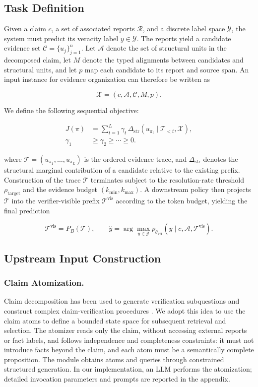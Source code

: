 \documentclass[letterpaper]{article}
\begin{document}
\subsection{Task Definition}

Given a claim $c$, a set of associated reports $\mathcal R$, and a discrete label space $\mathcal Y$, the system must predict its veracity label $y\in\mathcal Y$. The reports yield a candidate evidence set $\mathcal C=\{u_j\}_{j=1}^{n}$. Let $\mathcal A$ denote the set of structural units in the decomposed claim, let $M$ denote the typed alignments between candidates and structural units, and let $p$ map each candidate to its report and source span. An input instance for evidence organization can therefore be written as

\[
\mathcal X=(c,\mathcal A,\mathcal C,M,p).
\]

We define the following sequential objective:

\[
\begin{aligned}
J(\pi)
&=\sum_{t=1}^{L}\gamma_t\,
\Delta_{\mathrm{str}}\!\left(u_{\pi_t}\mid \mathcal T_{<t},\mathcal X\right),\\
\gamma_1&\ge\gamma_2\ge\cdots\ge 0.
\end{aligned}
\]

where $\mathcal T=(u_{\pi_1},\ldots,u_{\pi_L})$ is the ordered evidence trace, and $\Delta_{\mathrm{str}}$ denotes the structural marginal contribution of a candidate relative to the existing prefix. Construction of the trace $\mathcal T$ terminates subject to the resolution-rate threshold $\rho_{\mathrm{target}}$ and the evidence budget $(k_{\min}, k_{\max})$. A downstream policy then projects $\mathcal T$ into the verifier-visible prefix $\mathcal T^{\mathrm{vis}}$ according to the token budget, yielding the final prediction

\[
\mathcal T^{\mathrm{vis}}=P_B(\mathcal T),
\qquad
\hat y=\arg\max_{y\in\mathcal Y}
p_{\theta_{\mathrm{ver}}}(y\mid c,\mathcal A,\mathcal T^{\mathrm{vis}}).
\]

\subsection{Upstream Input Construction}

\subsubsection{Claim Atomization.}

Claim decomposition has been used to generate verification subquestions and construct complex claim-verification procedures \citep{Chen2022ClaimDecomp,Pan2023ProgramFC,Chen2023WildEvidence}. We adopt this idea to use the claim atoms to define a bounded state space for subsequent retrieval and selection. The atomizer reads only the claim, without accessing external reports or fact labels, and follows independence and completeness constraints: it must not introduce facts beyond the claim, and each atom must be a semantically complete proposition. The module obtains atoms and queries through constrained structured generation. In our implementation, an LLM performs the atomization; detailed invocation parameters and prompts are reported in the appendix.
\end{document}
